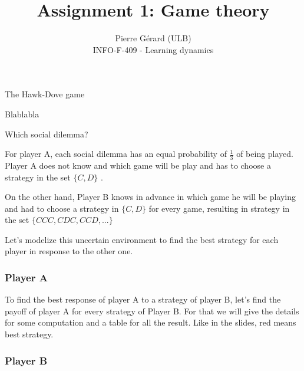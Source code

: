\documentclass[11pt]{article}
\newenvironment{exercise}[2][Exercise]{\begin{trivlist}
\item[\hskip \labelsep {\bfseries #1}\hskip \labelsep {\bfseries #2.}]}{\end{trivlist}}
\begin{document}
 
 
\setlength\parindent{0pt}
 
\title{Assignment 1: Game theory}%
\author{Pierre Gérard (ULB)\\ %
INFO-F-409 - Learning dynamics} %
 
\maketitle

\begin{exercise}{1} The Hawk-Dove game
\end{exercise}

Blablabla

\begin{exercise}{2} Which social dilemma?
\end{exercise}

For player A, each social dilemma has an equal probability of $\frac{1}{3}$ of being played. Player A does not know and which game will be play and has to choose a strategy in the set $\{C, D \}$ . 

On the other hand, Player B knows in advance in which game he will be playing and had to choose a strategy in $\{C, D \}$ for every game, resulting in strategy in the set $\{ CCC, CDC, CCD, ... \} $

Let's modelize this uncertain environment to find the best strategy for each player in response to the other one.

\subsubsection{Player A}

To find the best response of player A to a strategy of player B, let's find the payoff of player A for every strategy of Player B. For that we will give the details for some computation and a table for all the result. Like in the slides, red means best strategy.


\subsubsection{Player B}
\end{document}
